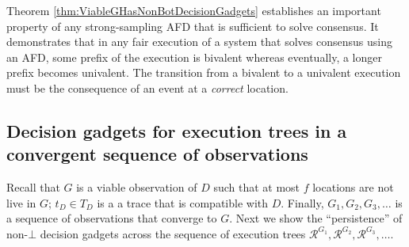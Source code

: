 \documentclass[11pt]{article}
\numberwithin{theorem}{section}
\begin{document}
Theorem \ref{thm:ViableGHasNonBotDecisionGadgets} establishes an important property of any strong-sampling AFD that is sufficient to solve consensus. It demonstrates that in any fair execution of a system that solves consensus using an AFD, some prefix of the execution is bivalent whereas eventually, a longer prefix becomes univalent. The transition from a bivalent to a univalent execution must be the consequence of an event at a \emph{correct} location.


\subsection{Decision gadgets for execution trees in a convergent sequence of observations}
Recall that $G$ is a viable observation of $D$ such that at most $f$ locations are not
live in $G$; $t_D \in T_D$ is a a trace that is compatible with $D$. Finally, $G_1, G_2, G_3, \ldots$ is a sequence of observations that converge to $G$. Next we show the ``persistence'' of non-$\bot$ decision gadgets across the sequence of execution trees $\mathcal{R}^{G_1}, \mathcal{R}^{G_2}, \mathcal{R}^{G_3}, \ldots$.
\end{document}
